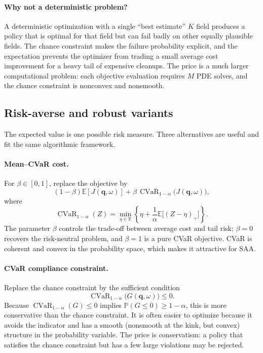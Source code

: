 \documentclass[11pt]{article}
\numberwithin{equation}{section}
\newcommand{\R}{\mathbb{R}}
\newcommand{\E}{\mathbb{E}}
\newcommand{\Prob}{\mathbb{P}}
\newcommand{\CVaR}{\operatorname{CVaR}}
\theoremstyle{plain}
\begin{document}
\paragraph{Why not a deterministic problem?}
A deterministic optimization with a single ``best estimate'' $K$ field
produces a policy that is optimal for that field but can fail badly on other
equally plausible fields.  The chance constraint makes the failure probability
explicit, and the expectation prevents the optimizer from trading a small
average cost improvement for a heavy tail of expensive cleanups.  The price is
a much larger computational problem: each objective evaluation requires $M$
PDE solves, and the chance constraint is nonconvex and nonsmooth.

\subsection{Risk-averse and robust variants}
\label{sec:risk}

The expected value is one possible risk measure.  Three alternatives are
useful and fit the same algorithmic framework.

\paragraph{Mean--CVaR cost.}
For $\beta\in[0,1]$, replace the objective by
\begin{equation}
\label{eq:meancvar}
(1-\beta)\E[J(\mathbf{q},\omega)]
+\beta\,\CVaR_{1-\alpha}\bigl(J(\mathbf{q},\omega)\bigr),
\end{equation}
where
\begin{equation}
\label{eq:cvar}
\CVaR_{1-\alpha}(Z)
=\min_{\eta\in\R}\left\{
\eta+\frac{1}{\alpha}\E\bigl[(Z-\eta)_+\bigr]
\right\}.
\end{equation}
The parameter $\beta$ controls the trade-off between average cost and
tail risk; $\beta=0$ recovers the risk-neutral problem, and $\beta=1$ is a
pure CVaR objective.  CVaR is coherent and convex in the probability space,
which makes it attractive for SAA.

\paragraph{CVaR compliance constraint.}
Replace the chance constraint by the sufficient condition
\begin{equation}
\label{eq:cvarchance}
\CVaR_{1-\alpha}\bigl(G(\mathbf{q},\omega)\bigr)\le0.
\end{equation}
Because $\CVaR_{1-\alpha}(G)\le0$ implies
$\Prob(G\le0)\ge1-\alpha$, this is more conservative than the chance
constraint.  It is often easier to optimize because it avoids the indicator
and has a smooth (nonsmooth at the kink, but convex) structure in the
probability variable.  The price is conservatism: a policy that satisfies the
chance constraint but has a few large violations may be rejected.
\end{document}
